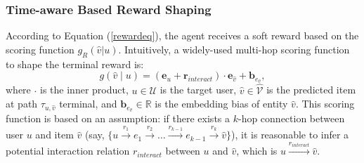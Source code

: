 \subsubsection{\textbf{Time-aware Based Reward Shaping}}\label{rewardShape}
According to Equation (\ref{rewardeq}), the agent receives a soft reward based on the scoring function $g_R(\hat{v} | u)$. Intuitively, a widely-used  multi-hop scoring function \cite{pgpr} to shape the terminal reward is: 
\begin{equation}
g(\hat{v} \mid u) = (\boldsymbol{e}_u + \boldsymbol{r}_{interact}) \cdot 
\boldsymbol{e}_{\hat{v}} + \boldsymbol{b}_{e_{\hat{v}}},
\end{equation}
where $\cdot$ is the inner product, $u \in \mathcal{U}$ is the target user, $\hat{v} \in \hat{\mathcal{V}}$ is the predicted item at path $\tau_{u, \hat{v}}$ terminal, and $\boldsymbol{b}_{e_{\hat{v}}} \in \mathbb{R}$ is the embedding bias of entity $\hat{v}$. This scoring function is based on an assumption: if there exists a $k$-hop connection between user $u$ and item $\hat{v}$ (say, $\{u\stackrel{r_{1}}{\longrightarrow} e_{1} \stackrel{r_{2}}{\longrightarrow} \ldots \stackrel{r_{k-1}}{\longrightarrow} e_{k-1} \stackrel{r_{k}}{\longrightarrow} \hat{v}\}$), it is reasonable to infer a potential interaction relation $r_{interact}$ between $u$ and $\hat{v}$, which is $u\stackrel{r_{interact}}{\longrightarrow} \hat{v}$.


